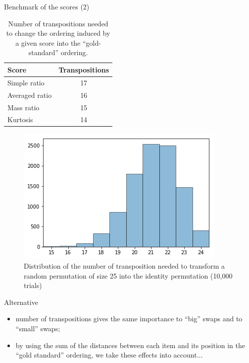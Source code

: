 \documentclass[xcolor=table, hyperref={pdfpagelabels=false}]{beamer}
\newcommand\SmallCaption[1]{%
	\captionsetup{font=scriptsize}%
	\caption{#1}}
\begin{document}
\begin{frame}{Benchmark of the scores (2)}
\begin{minipage}{.45\textwidth}
	\begin{table}[H]
		\centering
		\begin{tabular}{l|c}
			Score & Transpositions\\ \hline
			Simple ratio & 17 \\
			Averaged ratio & 16 \\
			Mass ratio & 15 \\
			Kurtosis & 14
		\end{tabular}
		\SmallCaption{Number of transpositions needed to change the ordering induced by a given score into the ``gold-standard'' ordering.}
		\label{tab:benchmark_scores}
	\end{table}
\end{minipage}\quad
\begin{minipage}{.5\textwidth}
	\begin{figure}[H]
		\centering
		\includegraphics[width=.8\textwidth]{./images/hist_transpositions.png}
		\SmallCaption{Distribution of the number of transposition needed to transform a random permutation of size 25 into the identity permutation (10,000 trials)}
		\label{fig:random_permutation}
	\end{figure}
\end{minipage}
\vspace{-3mm}
\begin{alertblock}{Alternative}
	\begin{itemize}
		\item number of transpositions gives the same importance to ``big'' swaps and to ``small'' swaps;
		\item by using the sum of the distances between each item and its position in the ``gold standard'' ordering, we take these effects into account...
	\end{itemize}
\end{alertblock}
\end{frame}
\end{document}
